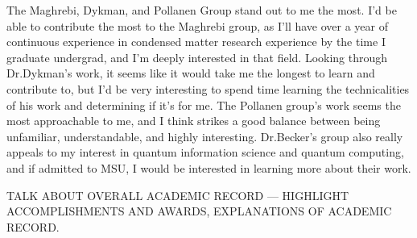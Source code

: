 \documentclass[11pt]{article}
\begin{document}
The Maghrebi, Dykman, and Pollanen Group stand out to me the most. I'd be able to contribute the most to the Maghrebi group, as I'll have over a year of continuous experience in condensed matter research experience by the time I graduate undergrad, and I'm deeply interested in that field. Looking through Dr.\@ Dykman's work, it seems like it would take me the longest to learn and contribute to, but I'd be very interesting to spend time learning the technicalities of his work and determining if it's for me. The Pollanen group's work seems the most approachable to me, and I think strikes a good balance between being unfamiliar, understandable, and highly interesting. Dr.\@ Becker's group also really appeals to my interest in quantum information science and quantum computing, and if admitted to MSU, I would be interested in learning more about their work.

TALK ABOUT OVERALL ACADEMIC RECORD --- HIGHLIGHT ACCOMPLISHMENTS AND AWARDS, EXPLANATIONS OF ACADEMIC RECORD.
\end{document}
